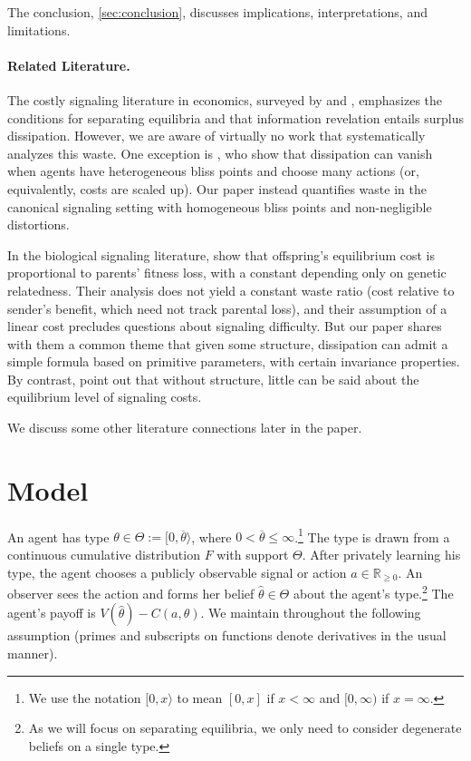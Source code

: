 \documentclass[12 pt]{article}
\theoremstyle{remark}
\theoremstyle{definition}
\newcommand{\R}{\mathbb{R}}
\newcommand{\Rpos}{\R_{\geq0}}
\def\typemin{0}
\def\typemax{\overline \theta}
\let\oldfootnote\footnote
\renewcommand\footnote[1]{\oldfootnote{\hspace{.5mm}#1}}
\begin{document}
The conclusion, \autoref{sec:conclusion}, discusses implications, interpretations, and limitations.

\paragraph{Related Literature.} The costly signaling literature in economics, surveyed by \citet{Riley01} and \citet{Sobel09}, emphasizes the conditions for separating equilibria and 
that information revelation entails surplus dissipation. 
However, we are aware of virtually no work that systematically analyzes this waste. One exception is \citet{BBC23}, who show that dissipation can vanish when agents have heterogeneous bliss points and choose many actions (or, equivalently, costs are scaled up). Our paper instead quantifies waste in the canonical signaling setting with homogeneous bliss points and non-negligible distortions. 


In the biological signaling literature, \citet{NoldekeSamuelson99} show that offspring's equilibrium cost is proportional to parents' fitness loss, with a constant depending only on genetic relatedness. Their analysis does not yield a constant waste ratio (cost relative to sender's benefit, which need not track parental loss), and their assumption of a linear cost precludes questions about signaling difficulty. But our paper shares with them a common theme that given some structure, dissipation can admit a simple formula based on primitive parameters, with certain invariance properties. By contrast, \citet{BSL02} point out that without structure, little can be said about the equilibrium level of signaling costs.

We discuss some other literature connections later in the paper.

\section{Model}
\label{sec:model}

An agent has type $\theta\in \Theta:=[\typemin,\typemax\rangle$, where $0<\typemax \leq \infty$.\footnote{We use the notation $[\typemin,x\rangle$ to mean $[\typemin,x]$ if $x<\infty$ and $[0,\infty)$ if $x=\infty$.}  The type is drawn from a continuous cumulative distribution $F$ with support $\Theta$. After privately learning his type, the agent chooses a publicly observable signal or action $a \in \Rpos$. An observer sees the action and forms her belief $\hat \theta \in \Theta$ about the agent's type.\footnote{As we will focus on separating equilibria, we only need to consider degenerate beliefs on a single type.} The agent's payoff is $
V(\hat\theta) - C(a, \theta)$. We maintain throughout the following assumption (primes and subscripts on functions denote derivatives in the usual manner).
\end{document}
